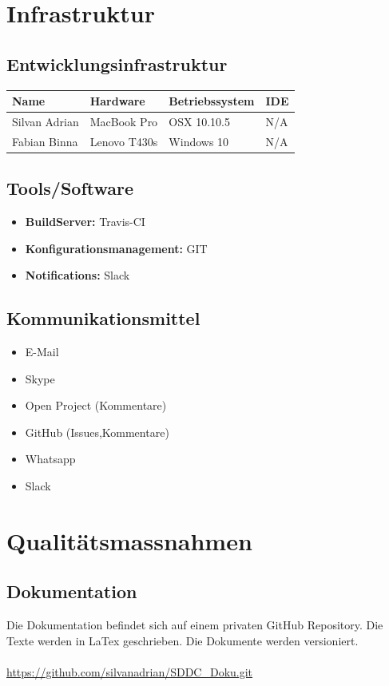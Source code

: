 \documentclass[11pt]{scrartcl}
\begin{document}
\section{Infrastruktur}

\subsection{Entwicklungsinfrastruktur}

\begin{tabularx}{\textwidth}{X X X X}
\textbf{Name} & \textbf{Hardware} & \textbf{Betriebssystem} & \textbf{IDE} \\
\hline
Silvan Adrian & MacBook Pro & OSX 10.10.5 &  N/A \\
\hline
Fabian Binna & Lenovo T430s & Windows 10 &  N/A\\
\hline
\end{tabularx}

\subsection{Tools/Software}
\begin{itemize}
    \item \textbf{BuildServer:} Travis-CI
    \item \textbf{Konfigurationsmanagement:} GIT
    \item \textbf{Notifications:} Slack
\end{itemize}

\subsection{Kommunikationsmittel}
\begin{itemize}
    \item E-Mail
    \item Skype
    \item Open Project (Kommentare)
    \item GitHub (Issues,Kommentare)
    \item Whatsapp
    \item Slack
\end{itemize}

\section{Qualitätsmassnahmen}
\subsection{Dokumentation}
Die Dokumentation befindet sich auf einem privaten GitHub Repository.
Die Texte werden in LaTex geschrieben. Die Dokumente werden versioniert.\\
\\
\url{https://github.com/silvanadrian/SDDC_Doku.git}
\end{document}
